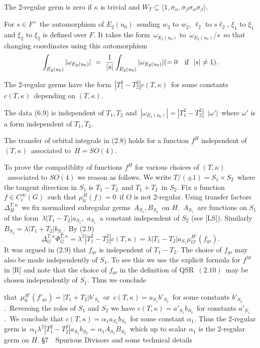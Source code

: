   The 2-regular germ is zero if  $\kappa$ is trivial and
$W_T \subseteq \langle 1, \sigma_\alpha, \sigma_\beta\sigma_\alpha\sigma_\beta\rangle$.
\endproclaim

  For  $s\in F^\times$  the automorphism of  $E_2(u_0)$\ sending
$w_2$ to $w_2$,  $\ell_2$ to $s\ell_2$, $\xi_1$ to $\xi_1$ and $\xi_2$ to $\xi_2$  is  defined
over $F$.  It takes the form\ $\omega_{E_2(u_0)}$  to\ $\omega_{E_2(u_0)}/{s}$\ so that changing coordinates using this automorphism 
$$
\int_{E_2(u_0)} |\omega_{E_2(u_0)}|\ =\ {{1}\over {|s|}} \int_{E_2(u_0)}
|\omega_{E_2(u_0)}| (= 0 \quad {\text{if}} ~~ |s| \ne 1).
$$

  The 2-regular germs have the form\ 
$|T_1^2-T^2_2| c(T,\kappa)$\  for some constants\ $c(T,\kappa)$\ depending on  $(T,\kappa)$.
\endproclaim

  The data (6.9) is independent of  $T_1,T_2$ and\
$|\omega_{E_2(u_0)}| = |T_1^2-T^2_2|$\ $|\omega'|$\ where $\omega'$  is a form independent
of  $T_1,T_2$.


  The transfer of orbital integrals in (2.8) holds for a
function  $f^H$  independent of  $(T,\kappa)$\ associated to\ $H = SO(4)$.
\endproclaim

  To prove the compatiblity of functions  $f^H$  for various choices
of  $(T,\kappa)$\ associated to $SO(4)$  we reason as follows.  We write 
$T/(\pm 1) = S_1\times S_2$\ where the tangent direction in  $S_1$  is  $T_1-T_2$\
and $T_1+T_2$\ in $S_2$.  Fix a function  $f\in C_c^\infty(G)$\ such that
$\mu_0^H(f) = 0$\ if  $O$  is not 2-regular.  Using transfer factors\
$\Delta_H^{T,\kappa}$\ we fix normalized subregular germs\ $A_{S_1}, B_{S_2}$\ on
$H$.\ $A_{S_1}$\ are functions on  $S_1$ of the form\ $\lambda|T_1-T_2|a_{S_1}$,\
$a_{S_1}$\ a constant independent of  $S_2$ (see [LS]).  Similarly\
$B_{S_2} = \lambda|T_1+T_2|b_{S_2}$.\ By (2.9)\ 
$$\Delta_G^{T,\kappa}\Phi_G^{T,\kappa}
= \lambda^2|T_1^2-T_2^2|c(T,\kappa) = \lambda|T_1-T_2|a_{S_1} 
\mu_{O'}^{H'}(f_{qs}).$$
\noindent It was argued in (2.9) that  $f_{qs}$  is independent of  $T_1-T_2$.
The choice of  $f_{qs}$  may also
be made independently of  $S_1$.  To see this  we use the explicit formula for
$f^M$ in [R] and note that the choice of  $f_{qs}$  in the definition of  QSR\
$(2.10)$\ may be chosen independently of  $S_1$.  Thus we conclude 

\pagebreak
that\
$\mu_0^{H'}(f'_{qs}) = |T_1+T_2|b'_{S_2}$\ or\ $c(T,\kappa) = a_{S_1}b'_{S_2}$\
for some constants  $b'_{S_2}$.\ Reversing the roles of  $S_1$  and $S_2$  we have
$c(T,\kappa) = a'_{S_1}b_{S_2}$\  for constants  $a'_{S_1}$.\  We conclude that
$c(T,\kappa) = \alpha_1 a_{S_1}b_{S_2}$\ for some constant $\alpha_1$.  Thus the
2-regular germ is\ $\alpha_1\lambda^2|T_1^2-T_2^2|a_{S_1}b_{S_2} = 
\alpha_1 A_{S_1} B_{S_2}$\  which up to scalar $\alpha_1$ is the 2-regular germ
on $H$.\heading
\S 7\ \ Spurious Divisors and some technical details 
\endheading

